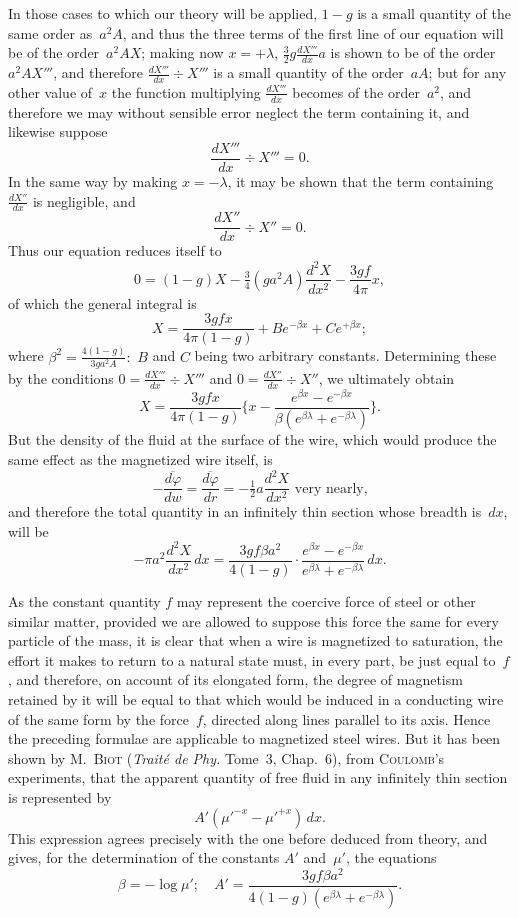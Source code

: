 \documentclass[12pt,notitlepage]{amsart}
\let\Person\textsc
\let\Title\textit
\renewcommand{\phi}{\varphi}
\begin{document}
In those cases to which our theory will be applied, $1-g$ is a small
quantity of the same order as~$a^2A$, and thus the three terms of the first line
of our equation will be of the order~$a^2AX$;
making now $x=+\lambda$, $\tfrac32g\frac{dX'''}{dx}a$
is shown to be of the order~$a^2AX'''$,
and therefore $\frac{dX'''}{dx}\div X'''$ is a small
quantity of the order~$aA$; but for any other value of~$x$ the function 
multiplying $\frac{dX'''}{dx}$ becomes of the order~$a^2$,
and therefore we may without sensible
error neglect the term containing it, and likewise suppose
\[
\frac{dX'''}{dx}\div X'''=0.
\]
In the same way by making $x=-\lambda$, it may be shown that the term 
containing $\frac{dX''}{dx}$ is negligible, and
\[
\frac{dX''}{dx}\div X''=0.
\]
Thus our equation reduces itself to
\[
0=(1-g)X-\tfrac34(ga^2A)\frac{d^2X}{dx^2}-\frac{3gf}{4\pi}x,
\]
of which the general integral is
\[
X=\frac{3gfx}{4\pi(1-g)}+Be^{-\beta x}+Ce^{+\beta x};
\]
where $\beta^2=\frac{4(1-g)}{3ga^2A}:$ $B$ and $C$ being
two arbitrary constants. Determining
these by the conditions $0=\frac{dX'''}{dx}\div X'''$
and $0=\frac{dX''}{dx}\div X''$, we ultimately obtain
\[
X=\frac{3gfx}{4\pi(1-g)}
\biggl\{
  x-\frac{e^{\beta x}-e^{-\beta x}}{\beta(e^{\beta\lambda}+e^{-\beta\lambda})}
\biggr\}.
\]
But the density of the fluid at the surface of the wire, which would produce
the same effect as the magnetized wire itself, is
\[
-\frac{\overline{d\phi}}{dw}
=\frac{\overline{d\phi}}{dr}
=-\tfrac12a\frac{d^2X}{dx^2}
\text{\ very nearly,}
\]
and therefore the total quantity in an infinitely thin section whose breadth
is~$dx$, will be
\[
-\pi a^2\frac{d^2X}{dx^2}\,dx=
\frac{3gf\beta a^2}{4(1-g)}\cdot
\frac{e^{\beta x}-e^{-\beta x}}{e^{\beta\lambda}+e^{-\beta\lambda}}\,dx.
\]

As the constant quantity $f$ may represent the coercive force of steel
or other similar matter, provided we are allowed to suppose this force the
same for every particle of the mass, it is clear that when a wire is magnetized
to saturation, the effort it makes to return to a natural state must, in every
part, be just equal to~$f$, and therefore, on account of its elongated form, the
degree of magnetism retained by it will be equal to that which would be
induced in a conducting wire of the same form by the force~$f$, directed along
lines parallel to its axis. Hence the preceding formulae are applicable to
magnetized steel wires. But it has been shown
by M.~\Person{Biot} (\Title{Trait\'e de Phy.}
Tome~3, Chap.~6), from \Person{Coulomb}'s experiments,
that the apparent quantity of
free fluid in any infinitely thin section is represented by
\[
A'(\mu'^{-x}-\mu'^{+x})\,dx.
\]
This expression agrees precisely with the one before deduced from theory,
and gives, for the determination of the constants $A'$ and~$\mu'$,
the equations
\[
\beta=-\log\mu';\quad
A'=\frac{3gf\beta a^2}{4(1-g)(e^{\beta\lambda}+e^{-\beta\lambda})}.
\]
\end{document}

